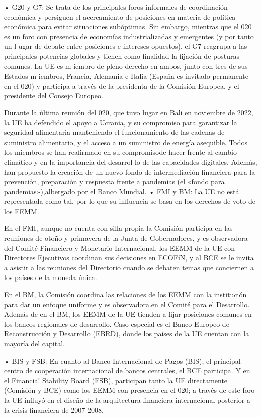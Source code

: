 \documentclass[10pt,a4paper]{article}
\begin{document}
• G20 y G7: Se trata de los principales foros informales de coordinación económica y persiguen el acercamiento de posiciones en materia de política económica para evitar situaciones subóptimas. Sin embargo, mientras que el 020 es un foro con presencia de economías industrializadas y emergentes (y por tanto un l ugar de debate entre posiciones e intereses opuestos), el G7 reagrupa a las principales potencias globales y tienen como finalidad la fijación de posturas comunes. La UE es m iembro de pleno derecho en ambos, junto con tres de sus Estados m iembros, Francia, Alemania e Italia (España es invitado permanente en el 020) y participa a través de la presidenta de la Comisión Europea, y el presidente del Consejo Europeo.

Durante la última reunión del 020, que tuvo lugar en Bali en noviembre de 2022, la UE ha defendido el apoyo a Ucrania, y su compromiso para garantizar la seguridad alimentaria manteniendo el funcionamiento de las cadenas de suministro alimentario, y el acceso a un suministro de energía asequible. Todos los miembros se han reafirmado en su compromisode hacer frente al cambio climático y en la importancia del desarrol lo de las capacidades digitales. Además, han propuesto la creación de un nuevo fondo de intermediación financiera para la prevención, preparación y respuesta frente a pandemias (el «fondo para pandemias»),albergado por el Banco Mundial.
• FMI y BM: La UE no está representada como tal, por lo que su influencia se basa en los derechos de voto de los EEMM.

En el FMI, aunque no cuenta con silla propia la Comisión participa en las reuniones de otoño y primavera de la Junta de Gobernadores, y es observadora del Comité Financiero y Monetario Internacional, los EEMM de la UE con Directores Ejecutivos coordinan sus decisiones en ECOFíN, y al BCE se le invita a asistir a las reuniones del Directorio cuando se debaten temas que conciernen a los países de la moneda única.

En el BM, la Comisión coordina las relaciones de los EEMM con la institución para dar un enfoque uniforme y es observadora.en el Comité para el Desarrollo. Además de en el BM, los EEMM de la UE tienden a fijar posiciones comunes en los bancos regionales de desarrollo. Caso especial es el Banco Europeo de Reconstrucción y Desarrollo (EBRD), donde los países de la UE cuentan con la mayoría del capital.

• BIS y FSB: En cuanto al Banco Internacional de Pagos (BIS), el principal centro de cooperación internacional de bancos centrales, el BCE participa. Y en el Financia! Stability Board (FSB), participan tanto la UE directamente (Comisión y BCE) como los EEMM con presencia en el 020; a través de este foro la UE influyó en el diseño de la arquitectura financiera internacional posterior a la crisis financiera de 2007-2008.
\end{document}
